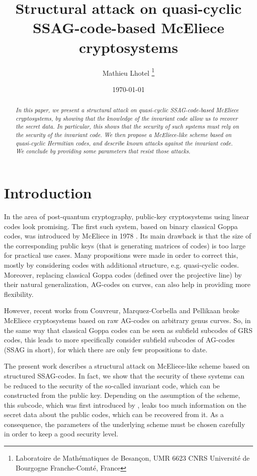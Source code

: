 \documentclass[10pt]{article}
\title{Structural attack on quasi-cyclic SSAG-code-based McEliece cryptosystems}
\author{Mathieu Lhotel \footnote{Laboratoire de Mathématiques de Besançon, UMR 6623 CNRS
        Université de Bourgogne Franche-Comté, France}}
\date{\today}
\newcommand{\s}{\vspace{0.3cm}}
\begin{document}
\maketitle

\begin{abstract} 
\it In this paper, we present a structural attack on quasi-cyclic SSAG-code-based McEliece cryptosystems, by showing that the knowledge of the invariant code allow us to recover the secret data. In particular, this shows that the security of such systems must rely on the security of the invariant code. We then propose a McEliece-like scheme based on quasi-cyclic Hermitian codes, and describe known attacks against the invariant code. We conclude by providing some parameters that resist those attacks.   
\end{abstract}

\newpage



\section{Introduction}

\s
In the area of post-quantum cryptography, public-key cryptosystems using linear codes look promising. The first such system, based on binary classical Goppa codes, was introduced by McEliece in 1978 \cite{McE}. Its main drawback is that the size of the corresponding public keys (that is generating matrices of codes) is too large for practical use cases. Many propositions were made in order to correct this, mostly by considering codes with additional structure, e.g. quasi-cyclic codes. Moreover, replacing classical Goppa codes (defined over the projective line) by their natural generalization, AG-codes on curves, can also help in providing more flexibility. 

\s

However, recent works from Couvreur, Marquez-Corbella and Pellikaan \cite{CMP} broke McEliece cryptosystems based on raw AG-codes on arbitrary genus curves. So, in the same way that classical Goppa codes can be seen as subfield subcodes of GRS codes, this leads to more specifically consider subfield subcodes of AG-codes (SSAG in short), for which there are only few propositions to date.

\s

The present work describes a structural attack on McEliece-like scheme based on structured SSAG-codes. In fact, we show that the security of these systems can be reduced to the security of the so-called invariant code, which can be constructed from the public key. Depending on the assumption of the scheme, this subcode, which was first introduced by \cite{LOI}, leaks too much information on the secret data about the public codes, which can be recovered from it. As a consequence, the parameters of the underlying scheme must be chosen carefully in order to keep a good security level.
\end{document}
